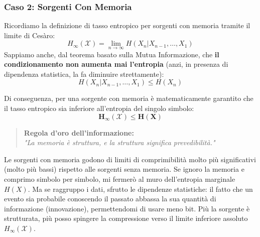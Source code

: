 \subsubsection*{Caso 2: Sorgenti Con Memoria}
Ricordiamo la definizione di tasso entropico per sorgenti con memoria tramite il limite di Cesàro:
\begin{equation}
    H_\infty(\mathcal{X}) = \lim_{n \to \infty} H(X_n | X_{n-1}, \dots, X_1)
\end{equation}
Sappiamo anche, dal teorema basato sulla Mutua Informazione, che \textbf{il condizionamento non aumenta mai l'entropia} (anzi, in presenza di dipendenza statistica, la fa diminuire strettamente):
\begin{equation}
    H(X_n | X_{n-1}, \dots, X_1) \le H(X_n)
\end{equation}

Di conseguenza, per una sorgente con memoria è matematicamente garantito che il tasso entropico sia inferiore all'entropia del singolo simbolo:
\begin{equation}
    \mathbf{H_\infty(\mathcal{X}) \le H(X)}
\end{equation}

\begin{quote}
    \textbf{Regola d'oro dell'informazione:} \\
    \textit{"La memoria è struttura, e la struttura significa prevedibilità."}
\end{quote}

Le sorgenti con memoria godono di limiti di comprimibilità molto più significativi (molto più bassi) rispetto alle sorgenti senza memoria. Se ignoro la memoria e comprimo simbolo per simbolo, mi fermerò al muro dell'entropia marginale $H(X)$. Ma se raggruppo i dati, sfrutto le dipendenze statistiche: il fatto che un evento sia probabile conoscendo il passato abbassa la sua quantità di informazione (innovazione), permettendomi di usare meno bit. Più la sorgente è strutturata, più posso spingere la compressione verso il limite inferiore assoluto $H_\infty(\mathcal{X})$.